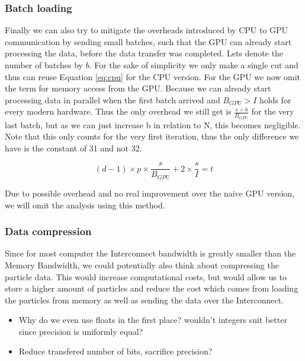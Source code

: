 \documentclass[]{article}
\begin{document}
\subsubsection{Batch loading}

Finally we can also try to mitigate the overheads introduced by CPU to GPU communication by sending small batches, such that the GPU can already start processing the data, before the data transfer was completed. Lets denote the number of batches by $b$. For the sake of simplicity we only make a single cut and thus can reuse Equation \ref{eq:cpu} for the CPU version. For the GPU we now omit the term for memory access from the GPU. Because we can already start processing data in parallel when the first batch arrived and $B_{GPU} > I$ holds for every modern hardware. Thus the only overhead we still get is $\frac{s \div b}{B_{GPU}}$ for the very last batch, but as we can just increase b in relation to N, this becomes negligible. Note that this only counts for the very first iteration, thus the only difference we have is the constant of 31 and not 32. 

\begin{center}
	\begin{equation}
		(d-1) \times p \times \frac{s}{B_{GPU}} + 2 \times \frac{s}{I} = t
		\label{eq:gpubatch}
	\end{equation}
\end{center}

Due to possible overhead and no real improvement over the naive GPU version, we will omit the analysis using this method.

\subsubsection{Data compression}

Since for most computer the Interconnect bandwidth is greatly smaller than the Memory Bandwidth, we could potentially also think about compressing the particle data. This would increase computational costs, but would allow us to store a higher amount of particles and reduce the cost which comes from loading the particles from memory as well as sending the data over the Interconnect.

\begin{itemize}
	\item Why do we even use floats in the first place? wouldn't integers suit better since precision is uniformly equal?
	\item Reduce transfered number of bits, sacrifice precision?
\end{itemize}
\end{document}
